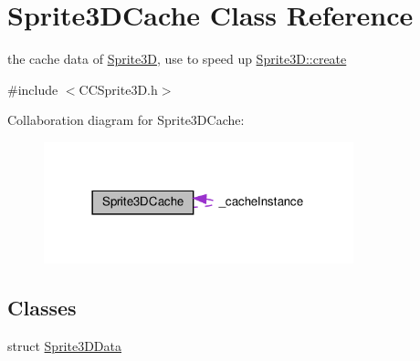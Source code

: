 \hypertarget{classSprite3DCache}{}\section{Sprite3\+D\+Cache Class Reference}
\label{classSprite3DCache}


the cache data of \hyperlink{classSprite3D}{Sprite3D}, use to speed up \hyperlink{classSprite3D_a10905e0480bfcf875882a9ad7b538d78}{Sprite3\+D\+::create}  




{\ttfamily \#include $<$C\+C\+Sprite3\+D.\+h$>$}



Collaboration diagram for Sprite3\+D\+Cache\+:
\nopagebreak
\begin{figure}[H]
\begin{center}
\leavevmode
\includegraphics[width=254pt]{classSprite3DCache__coll__graph}
\end{center}
\end{figure}
\subsection*{Classes}
\begin{DoxyCompactItemize}
\item 
struct \hyperlink{structSprite3DCache_1_1Sprite3DData}{Sprite3\+D\+Data}
\end{DoxyCompactItemize}
